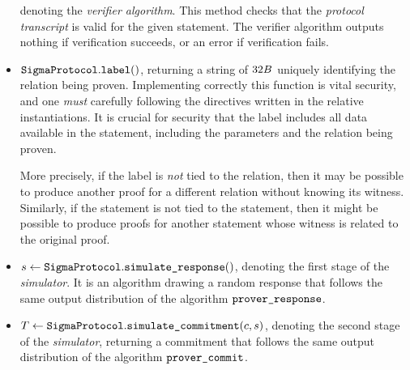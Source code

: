 \documentclass[11pt]{article}
\begin{document}
\begin{itemize}
          denoting the \emph{verifier algorithm}. This method checks that
          the \emph{protocol transcript} is valid for the given statement.
          The verifier algorithm outputs nothing if verification succeeds,
          or an error if verification fails.
          \item $\texttt{SigmaProtocol}.\texttt{label}()$,
          returning a string of $32B$ uniquely identifying the relation being proven.
          Implementing correctly this function is vital security, and one \emph{must} carefully following the directives written in the relative instantiations. It is crucial for security that the label includes all data available in the statement, including the parameters and the relation being proven.

          More precisely, if the label is \emph{not} tied to the relation, then it may be possible to produce another proof for a different relation without knowing its witness.
          Similarly, if the statement is not tied to the statement, then it might be possible to produce proofs
          for another statement whose witness is related to the original proof.

        \item $s \gets \texttt{SigmaProtocol}.\texttt{simulate\_response}()$,
        denoting the first stage of the \emph{simulator}. It is an algorithm drawing a random response that follows the same output distribution of the algorithm $\texttt{prover\_response}$.
        \item $T \gets \texttt{SigmaProtocol}.\texttt{simulate\_commitment}(c, s)$, denoting the second stage of the \emph{simulator}, returning a commitment that follows the same output distribution of the algorithm $\texttt{prover\_commit}$.
      \end{itemize}
\end{document}
